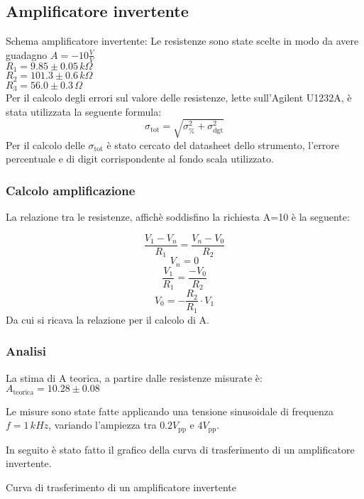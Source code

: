 \subsection{Amplificatore invertente}
Schema amplificatore invertente:
Le resistenze sono state scelte in modo da avere guadagno $A=-10 \frac{V}{V}$\\
$R_1=9.85 \pm 0.05\,k\Omega $\\ %
$R_2=101.3 \pm 0.6\,k\Omega$\\ %
$R_3=56.0 \pm 0.3\,\Omega$\\ %

Per il calcolo degli errori sul valore delle resistenze, lette sull'Agilent U1232A, è stata utilizzata la seguente formula:
$$\sigma_\textrm{tot}=\sqrt{ \sigma^{2} _\textrm{\%} + \sigma^{2} _\textrm{dgt}}$$
Per il calcolo delle $\sigma_\textrm{tot}$ è stato cercato del datasheet dello strumento, l'errore percentuale e di digit
corrispondente al fondo scala utilizzato.

\subsubsection{Calcolo amplificazione}
La relazione tra le resistenze, affichè soddisfino la richiesta A=10 è la seguente:

$$\frac{V_1-V_n}{R_1}=\frac{V_n-V_0}{R_2}$$
$$V_n=0$$
$$\frac{V_1}{R_1}=\frac{-V_0}{R_2}$$
$$V_0=-\frac{R_2}{R_1} \cdot V_1$$
Da cui si ricava la relazione per il calcolo di A.

\subsubsection{Analisi}
La stima di A teorica, a partire dalle resistenze misurate è:\\
$A_\textrm{teorica}=10.28 \pm 0.08$ %

Le misure sono state fatte applicando una tensione sinusoidale di frequenza $ f=1 \,kHz$, variando l'ampiezza tra 
$0.2 V_\textrm{pp}$ e $4 V_\textrm{pp}$.

In seguito è stato fatto il grafico della curva di trasferimento di un amplificatore invertente.

\begin{grafico}
 \centering
 \resizebox{\textwidth}{!}{%
 
 }%
 \caption{Curva di trasferimento di un amplificatore invertente} 
 \label{gr:amp_inv.tex} 
\end{grafico}


